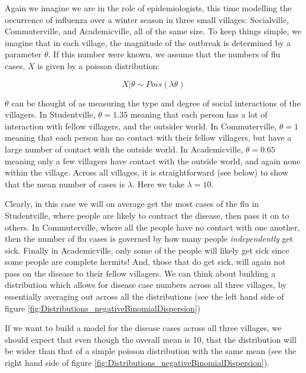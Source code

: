 \documentclass[11pt,fullpage]{book}
\begin{document}
Again we imagine we are in the role of epidemiologists, this time modelling the occurrence of influenza over a winter season in three small villages: Socialville, Commuterville, and Academicville, all of the same size. To keep things simple, we imagine that in each village, the magnitude of the outbreak is determined by a parameter $\theta$. If this number were known, we assume that the numbers of flu cases, $X$ is given by a poisson distribution:

\begin{equation}
X|\theta \sim Pois(\lambda\theta)
\end{equation}

$\theta$ can be thought of as measuring the type and degree of social interactions of the villagers. In Studentville, $\theta=1.35$ meaning that each person has a lot of interaction with fellow villagers, and the outsider world. In Commuterville, $\theta=1$ meaning that each person has no contact with their fellow villagers, but have a large number of contact with the outside world. In Academicville, $\theta=0.65$ meaning only a few villagers have contact with the outside world, and again none within the village. Across all villages, it is straightforward (see below) to show that the mean number of cases is $\lambda$. Here we take $\lambda=10$.

Clearly, in this case we will on average get the most cases of the flu in Studentville, where people are likely to contract the disease, then pass it on to others. In Commuterville, where all the people have no contact with one another, then the number of flu cases is governed by how many people \textit{independently} get sick. Finally in Academicville, only some of the people will likely get sick since some people are complete hermits! And, those that do get sick, will again not pass on the disease to their fellow villagers. We can think about building a distribution which allows for disease case numbers across all three villages, by essentially averaging out across all the distributions (see the left hand side of figure \ref{fig:Distributions_negativeBinomialDispersion})

If we want to build a model for the disease cases across all three villages, we should expect that even though the overall mean is 10, that the distribution will be wider than that of a simple poisson distribution with the same mean (see the right hand side of figure \ref{fig:Distributions_negativeBinomialDispersion}).
\end{document}
